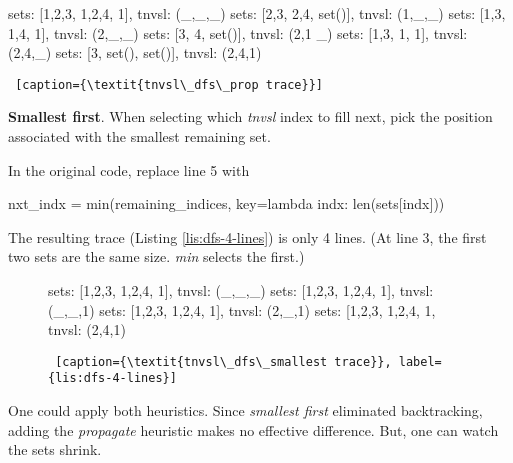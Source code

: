 \begin{flushright}
\begin{minipage}[c]{0.45\textwidth}
\begin{python1}  
sets: [{1,2,3}, {1,2,4}, {1}], tnvsl: (_,_,_)
  sets: [{2,3}, {2,4}, set()], tnvsl: (1,_,_)
  sets: [{1,3}, {1,4}, {1}], tnvsl: (2,_,_)
    sets: [{3}, {4}, set()], tnvsl: (2,1 _)
    sets: [{1,3}, {1}, {1}], tnvsl: (2,4,_)
      sets: [{3}, set(), set()], tnvsl: (2,4,1)
\end{python1}\linv
\begin{lstlisting} [caption={\textit{tnvsl\_dfs\_prop trace}}]
\end{lstlisting}
\end{minipage}
\end{flushright}

\noindent\textbf{Smallest first}. When selecting which \textit{tnvsl} index to fill next, pick the position associated with the smallest remaining set. 

In the original code, replace line 5 with
\begin{center}
\begin{minipage}[c]{0.45\textwidth}
\begin{python1}
 nxt_indx = min(remaining_indices,
                key=lambda indx: len(sets[indx]))
\end{python1}
\end{minipage}
\end{center}
The resulting trace (Listing \ref{lis:dfs-4-lines}) is only 4 lines. (At line 3, the first two sets are the same size. \textit{min} selects the first.) 

\begin{figure}[htb]
    \centering\begin{minipage}[c]{0.45\textwidth}
\begin{python1}  
sets: [{1,2,3}, {1,2,4}, {1}], tnvsl: (_,_,_)
  sets: [{1,2,3}, {1,2,4}, {1}], tnvsl: (_,_,1)
    sets: [{1,2,3}, {1,2,4}, {1}], tnvsl: (2,_,1)
      sets: [{1,2,3}, {1,2,4}, {1}, tnvsl: (2,4,1)
\end{python1}\linv
\begin{lstlisting} [caption={\textit{tnvsl\_dfs\_smallest trace}}, label={lis:dfs-4-lines}]
\end{lstlisting}\inv
\end{minipage}\linv
\end{figure}

One could apply both heuristics. Since \textit{smallest first} eliminated backtracking, adding the \textit{propagate} heuristic makes no effective difference. But, one can watch the sets shrink.


